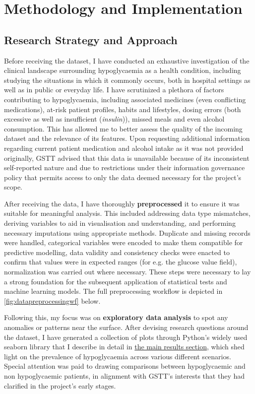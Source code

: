 \section{Methodology and Implementation}

	\subsection{Research Strategy and Approach}
	\noindent Before receiving the dataset, I have conducted an exhaustive investigation of the clinical landscape surrounding hypoglycaemia as a health condition, including studying the situations in which it commonly occurs, both in hospital settings as well as in public or everyday life. I have scrutinized a plethora of factors contributing to hypoglycaemia, including associated medicines (even conflicting medications), at-risk patient profiles, habits and lifestyles, dosing errors (both excessive as well as insufficient (\textit{insulin})), missed meals and even alcohol consumption. This has allowed me to better assess the quality of the incoming dataset and the relevance of its features. Upon requesting additional information regarding current patient medication and alcohol intake as it was not provided originally, GSTT advised that this data is unavailable because of its inconsistent self-reported nature and due to restrictions under their information governance policy that permits access to only the data deemed necessary for the project's scope.

	\vspace{10pt}
	\noindent After receiving the data, I have thoroughly \textbf{preprocessed} it to ensure it was suitable for meaningful analysis. This included addressing data type mismatches, deriving variables to aid in visualisation and understanding, and performing necessary imputations using appropriate methods. Duplicate and missing records were handled, categorical variables were encoded to make them compatible for predictive modelling, data validity and consistency checks were enacted to confirm that values were in expected ranges (for e.g. the glucose value field), normalization was carried out where necessary. These steps were necessary to lay a strong foundation for the subsequent application of statistical tests and machine learning models. The full preprocessing workflow is depicted in \autoref{fig:datapreprocessingwf} below. \
	
	\vspace{10pt}
	\noindent Following this, my focus was on \textbf{exploratory data analysis} to spot any anomalies or patterns near the surface. After devising research questions around the dataset, I have generated a collection of plots through Python's widely used seaborn library that I describe in detail in \hyperref[sec:mainResults]{the main results section}, which shed light on the prevalence of hypoglycaemia across various different scenarios. Special attention was paid to drawing comparisons between hypoglycaemic and non hypoglycaemic patients, in alignment with GSTT's interests that they had clarified in the project's early stages.

